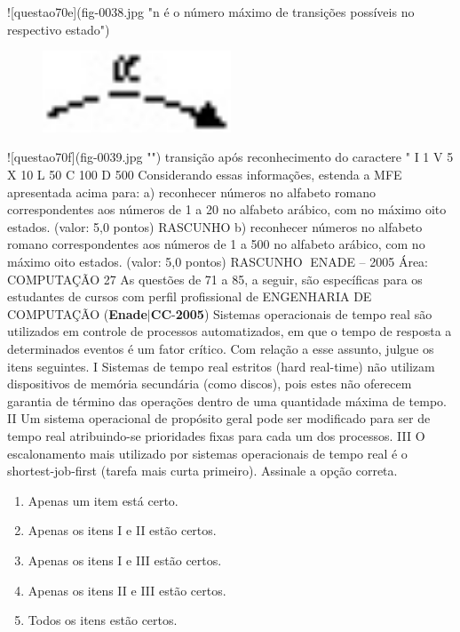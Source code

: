\documentclass{exam}
\begin{document}
\begin{questions}
![questao70e](fig-0038.jpg "n é o número máximo de transições possíveis no respectivo estado") 
\begin{figure}[H]
	\begin{center}
		\includegraphics[width=0.5\textwidth]{CIENCIA_DA_COMPUTACAO_Prova2005-utf8_figuras/fig-0039.jpg}
		\caption{}
	\end{center}
\end{figure}
![questao70f](fig-0039.jpg "")
transição após reconhecimento do caractere "
I 1
V 5
X 10
L 50
C 100
D 500
Considerando essas informações, estenda a MFE apresentada acima para:
a) reconhecer números no alfabeto romano correspondentes aos números de 1 a 20 no alfabeto arábico, com no máximo oito estados.
(valor: 5,0 pontos)
RASCUNHO
b) reconhecer números no alfabeto romano correspondentes aos números de 1 a 500 no alfabeto arábico, com no máximo oito
estados. (valor: 5,0 pontos)
RASCUNHO
ENADE – 2005 Área: COMPUTAÇÃO 27
As questões de 71 a 85, a seguir, são específicas para os estudantes de cursos com perfil profissional de
ENGENHARIA DE COMPUTAÇÃO
\question (\textbf{Enade}$|$\textbf{CC}-\textbf{2005}) Sistemas operacionais de tempo real são utilizados em controle
de processos automatizados, em que o tempo de resposta a
determinados eventos é um fator crítico. Com relação a esse
assunto, julgue os itens seguintes.
I Sistemas de tempo real estritos (hard real-time) não utilizam
dispositivos de memória secundária (como discos), pois estes
não oferecem garantia de término das operações dentro de
uma quantidade máxima de tempo.
II Um sistema operacional de propósito geral pode ser
modificado para ser de tempo real atribuindo-se prioridades
fixas para cada um dos processos.
III O escalonamento mais utilizado por sistemas operacionais de
tempo real é o shortest-job-first (tarefa mais curta primeiro).
Assinale a opção correta.
	\begin{enumerate}[label=\alph*)]
		\item  Apenas um item está certo.
		\item  Apenas os itens I e II estão certos.
		\item  Apenas os itens I e III estão certos.
		\item  Apenas os itens II e III estão certos.
		\item  Todos os itens estão certos.


\end{enumerate}
\end{questions}
\end{document}
